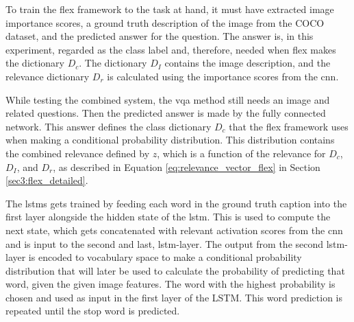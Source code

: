         To train the \gls{flex} framework to the task at hand, it must have extracted image importance scores, a ground truth description of the image from the COCO dataset, and the predicted answer for the question. 
        The answer is, in this experiment, regarded as the class label and, therefore, needed when \gls{flex} makes the dictionary $D_c$. The dictionary $D_I$ contains the image description, and the relevance dictionary $D_r$ is calculated using the importance scores from the \gls{cnn}.

        While testing the combined system, the \gls{vqa} method still needs an image and related questions. Then the predicted answer is made by the fully connected network. This answer defines the class dictionary $D_c$ that the \gls{flex} framework uses when making a conditional probability distribution. This distribution contains the combined relevance defined by $z$, which is a function of the relevance for $D_c$, $D_I$, and $D_r$, as described in Equation \ref{eq:relevance_vector_flex} in Section \ref{sec3:flex_detailed}.

        The \glspl{lstm} gets trained by feeding each word in the ground truth caption into the first layer alongside the hidden state of the \gls{lstm}. This is used to compute the next state, which gets concatenated with relevant activation scores from the \gls{cnn} and is input to the second and last, \gls{lstm}-layer. 
        The output from the second \gls{lstm}-layer is encoded to vocabulary space to make a conditional probability distribution that will later be used to calculate the probability of predicting that word, given the given image features. The word with the highest probability is chosen and used as input in the first layer of the LSTM.
        This word prediction is repeated until the stop word is predicted. 
        


    
            
